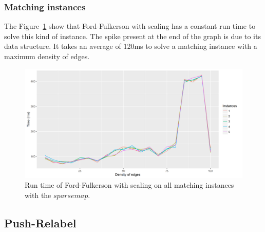 \subsubsection{Matching instances}
The Figure~\ref{fig:ffmatching} show that Ford-Fulkerson with scaling has a constant run time to solve this kind of instance. The spike present at the end of the graph is due to its data structure. It takes an average of 120ms to solve a matching instance with a maximum density of edges.
\begin{figure}[H]
\begin{center}
\includegraphics[scale=0.5]{images/results/ffmatching.png}
\caption{Run time of Ford-Fulkerson with scaling on all matching instances with the $sparse map$.}
\label{fig:ffmatching}
\end{center}
\end{figure}
\subsection{Push-Relabel}
